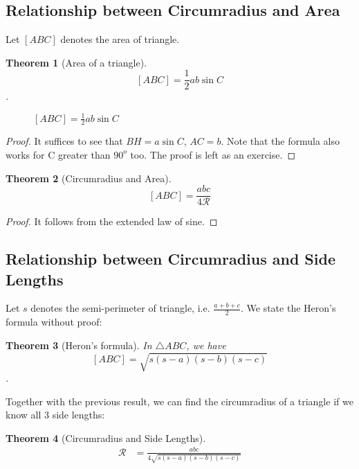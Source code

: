 \documentclass{article}
\newtheorem{theorem}{Theorem}[section]
\theoremstyle{definition}
\begin{document}
\subsection{Relationship between Circumradius and Area}
Let $[ABC]$ denotes the area of triangle.
\begin{mdframed}
	\begin{theorem}[Area of a triangle]
		$$[ABC] = \dfrac{1}{2}ab\sin C$$.
	\end{theorem}
	\begin{figure}[H]
		\centering
		\caption{$[ABC] = \frac{1}{2}ab \sin C$}
	\end{figure}
\end{mdframed}
\begin{proof}
	It suffices to see that $BH = a\sin C$, $AC=b$. Note that the formula also works for C greater than $90^o$ too. The proof is left as an exercise.
\end{proof}
\begin{mdframed}
			\begin{theorem}[Circumradius and Area]
				$$[ABC] = \dfrac{abc}{4\mathcal{R}}$$
			\end{theorem}
\end{mdframed}
\begin{proof}
	It follows from the extended law of sine.	
\end{proof}
\subsection{Relationship between Circumradius and Side Lengths}
Let $s$ denotes the semi-perimeter of triangle, i.e. $\frac{a+b+c}{2}$.
We state the Heron's formula without proof:
\begin{mdframed}
	\begin{theorem}[Heron's formula]
		In $\triangle ABC$, we have $$[ABC] = \sqrt{s(s-a)(s-b)(s-c)}$$.
	\end{theorem}
\end{mdframed}
Together with the previous result, we can find the circumradius of a triangle if we know all $3$ side lengths:
\begin{mdframed}
	\begin{theorem}[Circumradius and Side Lengths]
		\begin{align*}
			\mathcal{R} &= \tfrac{abc}{4\sqrt{s(s-a)(s-b)(s-c)} }
		\end{align*}
	\end{theorem}
\end{mdframed}
\end{document}
